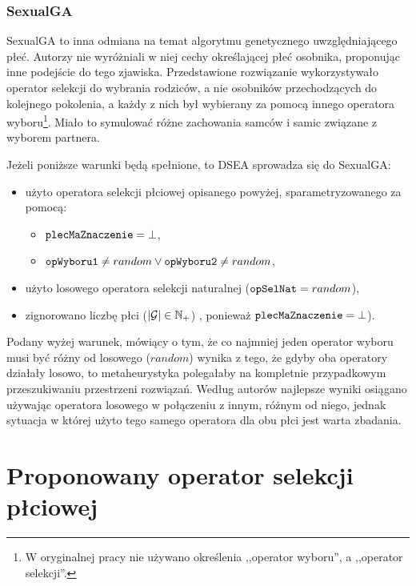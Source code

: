 \documentclass[./FM_mgr.tex]{subfiles}
\begin{document}
\subsubsection{SexualGA}

SexualGA \cite{SexualGA} to inna odmiana na temat algorytmu genetycznego uwzględniającego płeć. Autorzy nie wyróżniali w niej cechy określającej płeć osobnika, proponując inne podejście do tego zjawiska. Przedstawione rozwiązanie wykorzystywało operator selekcji do wybrania rodziców, a nie osobników przechodzących do kolejnego pokolenia, a każdy z nich był wybierany za pomocą innego operatora wyboru\footnote{
	W oryginalnej pracy nie używano określenia ,,operator wyboru'', a ,,operator selekcji''.
}. Miało to symulować różne zachowania samców i samic związane z wyborem partnera.

Jeżeli poniższe warunki będą spełnione, to DSEA sprowadza się do SexualGA:
\begin{itemize}
	\item użyto operatora selekcji płciowej opisanego powyżej, sparametryzowanego za pomocą:
	\begin{itemize}
		\item $\mathtt{plecMaZnaczenie} = \bot$,
		\item $\mathtt{opWyboru1} \neq random \vee \mathtt{opWyboru2} \neq random$,
	\end{itemize}
	\item użyto losowego operatora selekcji naturalnej ($\mathtt{opSelNat} = random$),
	\item zignorowano liczbę płci ($|\mathcal{G}| \in \mathbb{N}_{+}$) , ponieważ $\mathtt{plecMaZnaczenie} = \bot$).
\end{itemize}

Podany wyżej warunek, mówiący o tym, że co najmniej jeden operator wyboru musi być różny od losowego ($random$) wynika z tego, że gdyby oba operatory działały losowo, to metaheurystyka polegałaby na kompletnie przypadkowym przeszukiwaniu przestrzeni rozwiązań.
Według autorów najlepsze wyniki osiągano używając operatora losowego w połączeniu z innym, różnym od niego, jednak sytuacja w której użyto tego samego operatora dla obu płci jest warta zbadania.

\section{Proponowany operator selekcji płciowej}
\end{document}

